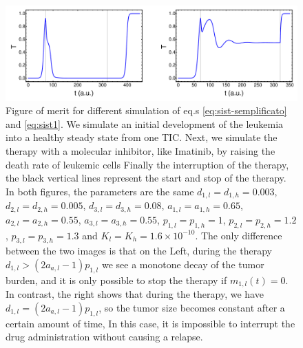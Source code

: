 \documentclass[a4paper,10pt]{article}
\begin{document}
\begin{figure}
\centering
\includegraphics[width=15cm] {esempio-unregolated.pdf}
\caption{Figure of merit for different simulation of eq.s \eqref{eq:sist-semplificato} and \eqref{eq:sist1}.
We simulate an initial development of the leukemia into a healthy steady state 
from one TIC. 
Next, we simulate the therapy with a molecular inhibitor,
like Imatinib, by raising the death rate of leukemic cells
\cite{effetto-imatinib-1, effetto-imatinib-2, effetto-imatinib-3} 
Finally the interruption of the therapy, the black vertical lines represent the start
and stop of the therapy. 
In both figures, the parameters are the same $d_{1,l}=d_{1,h}=0.003$, $d_{2,l}=d_{2,h}=0.005$,
$d_{3,l}=d_{3,h}=0.08$, $a_{1,l}=a_{1,h}=0.65$, $a_{2,l}=a_{2,h}=0.55$, 
$a_{3,l}=a_{3,h}=0.55$, $p_{1,l}=p_{1,h}=1$, $p_{2,l}=p_{2,h}=1.2$,
$p_{3,l}=p_{3,h}=1.3$ and $K_{l}=K_{h}=1.6\times 10^{-10}$. 
The only difference between the two images is that on the
Left, during the therapy $d_{1,l}>(2a_{a,l}-1)p_{1,l}$ we see a monotone 
decay of the tumor burden, and it is only possible to stop the therapy if $m_{1,l}(t)=0$. 
In contrast, the right shows that during the therapy, we have $d_{1,l}=(2a_{a,l}-1)p_{1,l}$, so the tumor size becomes constant after a certain amount of time, 
In this case, it is impossible to interrupt the drug administration without causing a relapse.\\
} 
\label{fig:model1}
\end{figure}
\end{document}
